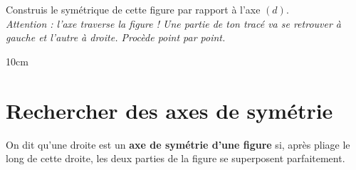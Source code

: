 \documentclass[a4paper]{book}
\begin{document}
    \begin{exemple}
        Construis le symétrique de cette figure par rapport à l'axe $(d)$. \\
        \textit{Attention : l'axe traverse la figure ! Une partie de ton tracé va se retrouver à gauche et l'autre à droite. Procède point par point.}
        \begin{ZoneReponse}{10cm}
        \begin{center}
        \end{center}
        \end{ZoneReponse}
    \end{exemple}


\section{Rechercher des axes de symétrie}

    \begin{definition}
        On dit qu'une droite est un \textbf{axe de symétrie d'une figure} si, après pliage le long de cette droite, les deux parties de la figure se superposent parfaitement.
    \end{definition}
    
\end{document}
